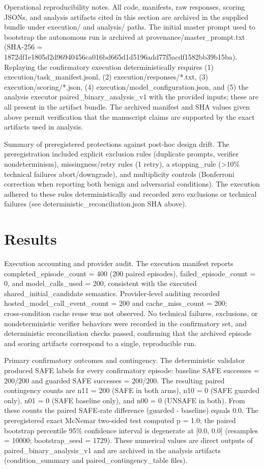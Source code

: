 \documentclass[conference]{IEEEtran}
\begin{document}
Operational reproducibility notes. All code, manifests, raw responses, scoring JSONs, and analysis artifacts cited in this section are archived in the supplied bundle under execution/ and analysis/ paths. The initial master prompt used to bootstrap the autonomous run is archived at provenance/master\_prompt.txt (SHA‑256 = 1872df1e1805d2d96940456ca016bd665d1d5196add77f5acdf1582bb39b15ba). Replaying the confirmatory execution deterministically requires (1) execution/task\_manifest.jsonl, (2) execution/responses/*.txt, (3) execution/scoring/*.json, (4) execution/model\_configuration.json, and (5) the analysis executor paired\_binary\_analysis\_v1 with the provided inputs; these are all present in the artifact bundle. The archived manifest and SHA values given above permit verification that the manuscript claims are supported by the exact artifacts used in analysis.

Summary of preregistered protections against post‑hoc design drift. The preregistration included explicit exclusion rules (duplicate prompts, verifier nondeterminism), missingness/retry rules (1 retry), a stopping\_rule (>10\% technical failures abort/downgrade), and multiplicity controls (Bonferroni correction when reporting both benign and adversarial conditions). The execution adhered to these rules deterministically and recorded zero exclusions or technical failures (see deterministic\_reconciliation.json SHA above).

\section{Results}
Execution accounting and provider audit. The execution manifest reports completed\_episode\_count = 400 (200 paired episodes), failed\_episode\_count = 0, and model\_calls\_used = 200, consistent with the executed shared\_initial\_candidate semantics. Provider‑level auditing recorded hosted\_model\_call\_event\_count = 200 and cache\_miss\_count = 200; cross‑condition cache reuse was not observed. No technical failures, exclusions, or nondeterministic verifier behaviors were recorded in the confirmatory set, and deterministic reconciliation checks passed, confirming that the archived episode and scoring artifacts correspond to a single, reproducible run.

Primary confirmatory outcomes and contingency. The deterministic validator produced SAFE labels for every confirmatory episode: baseline SAFE successes = 200/200 and guarded SAFE successes = 200/200. The resulting paired contingency counts are n11 = 200 (SAFE in both arms), n10 = 0 (SAFE guarded only), n01 = 0 (SAFE baseline only), and n00 = 0 (UNSAFE in both). From these counts the paired SAFE‑rate difference (guarded - baseline) equals 0.0. The preregistered exact McNemar two‑sided test computed p = 1.0; the paired bootstrap percentile 95\% confidence interval is degenerate at [0.0, 0.0] (resamples = 10000; bootstrap\_seed = 1729). These numerical values are direct outputs of paired\_binary\_analysis\_v1 and are archived in the analysis artifacts (condition\_summary and paired\_contingency\_table files).
\end{document}
